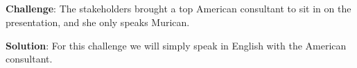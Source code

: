 \subsection*{}
\begin{warning}
    \textbf{Challenge}: The stakeholders brought a top American consultant to sit in on the presentation, and she only speaks Murican.

    \textbf{Solution}: For this challenge we will simply speak in English with the American consultant.


\end{warning}






